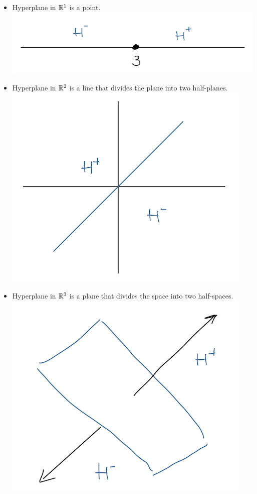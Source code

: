 \begin{itemize}
    \item Hyperplane in $\mathbb{R}^1$ is a point.\\
        \includegraphics[scale=0.4]{Images/2.png}
    \item Hyperplane in $\mathbb{R}^2$ is a line that divides the plane into two half-planes.\\
        \includegraphics[scale=0.4]{Images/3.png}
    \item Hyperplane in $\mathbb{R}^3$ is a plane that divides the space into two half-spaces.\\
        \includegraphics[scale=0.4]{Images/4.png}
\end{itemize}

